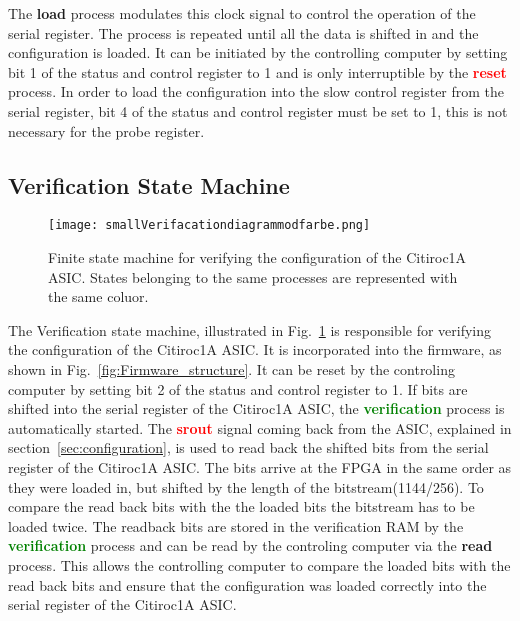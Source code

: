 The \textbf{\textcolor{VioletRed}{load}} process modulates this clock signal to control the operation of the serial register.
\newline
The process is repeated until all the data is shifted in and the configuration is loaded.
It can be initiated by the controlling computer by setting bit 1 of the status and control register to 1 and is only interruptible by the \textbf{\textcolor{red}{reset}} process.
\newline
In order to load the configuration into the slow control register from the serial register, bit 4 of the status and control register must be set to 1, this is not necessary for the probe register.

\subsection{Verification State Machine}
\begin{figure}[H]
    \centering
    \texttt{[image: smallVerifacationdiagrammodfarbe.png]}%
    \caption{Finite state machine for verifying the configuration of the Citiroc1A ASIC.
    States belonging to the same processes are represented with the same coluor.}
    \label{fig:Verification_state_machine}
\end{figure}
The Verification state machine, illustrated in Fig.~\ref{fig:Verification_state_machine} is responsible for verifying the configuration of the Citiroc1A ASIC.
It is incorporated into the firmware, as shown in Fig.~\ref{fig:Firmware_structure}.
\newline
It can be reset by the controling computer by setting bit 2 of the status and control register to 1.
\newline
If bits are shifted into the serial register of the Citiroc1A ASIC, the \textbf{\textcolor{green}{verification}} process is automatically started.
The \textbf{\textcolor{red}{srout}} signal coming back from the ASIC, explained in section~\ref{sec:configuration}, is used to read back the shifted bits from the serial register of the Citiroc1A ASIC.
The bits arrive at the FPGA in the same order as they were loaded in, but shifted by the length of the bitstream(1144/256). To compare the read back bits with the the loaded bits the bitstream has to be loaded twice.
\newline
The readback bits are stored in the verification RAM by the \textbf{\textcolor{green}{verification}} process and can be read by the controling computer via the  \textbf{\textcolor{yellow!60!black}{read}} process.
This allows the controlling computer to compare the loaded bits with the read back bits and ensure that the configuration was loaded correctly into the serial register of the Citiroc1A ASIC.
